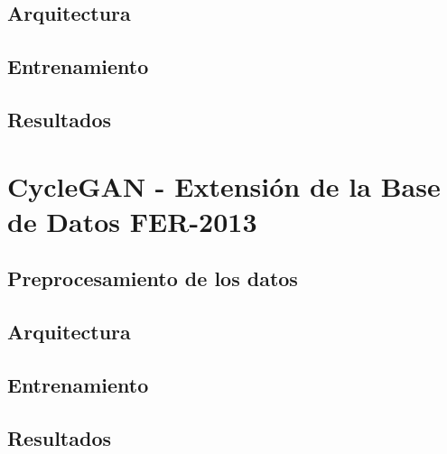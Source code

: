 \subsection{Arquitectura}

\subsection{Entrenamiento}

\subsection{Resultados}




\section{CycleGAN - Extensión de la Base de Datos FER-2013}

\subsection{Preprocesamiento de los datos}

\subsection{Arquitectura}

\subsection{Entrenamiento}

\subsection{Resultados}